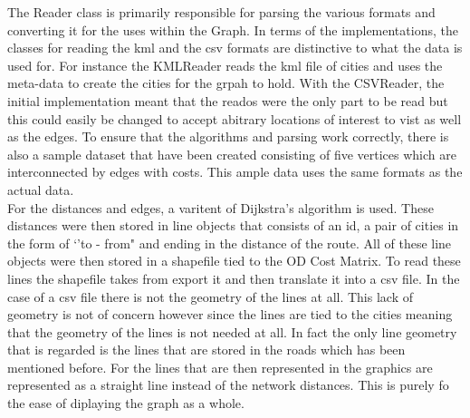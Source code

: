 \documentclass[midd]{thesis}
\newcommand{\tab}{\hspace*{2em}}
\begin{document}
\tab The Reader class is primarily responsible for parsing the various formats and converting it for the uses within the Graph. In terms of the implementations, the classes for reading the kml and the csv formats are distinctive to what the data is used for. For instance the KMLReader reads the kml file of cities and uses the meta-data to create the cities for the grpah to hold. With the CSVReader, the initial implementation meant that the reados were the only part to be read but this could easily be changed to accept abitrary locations of interest to vist as well as the edges. To ensure that the algorithms and parsing work correctly, there is also a sample dataset that have been created consisting of five vertices which are interconnected by edges with costs. This ample data uses the same formats as the actual data.\\
\tab For the distances and edges, a varitent of Dijkstra's algorithm is used\cite{gis}. These distances were then stored in line objects that consists of an id, a pair of cities in the form of `'to - from" and ending in the distance of the route. All of these line objects were then stored in a shapefile tied to the OD Cost Matrix. To read these lines the shapefile takes from export it and then translate it into a csv file. In the case of a csv file there is not the geometry of the lines at all. This lack of geometry is not of concern however since the lines are tied to the cities meaning that the geometry of the lines is not needed at all. In fact the only line geometry that is regarded is the lines that are stored in the roads which has been mentioned before. For the lines that are then represented in the graphics are represented as a straight line instead of the network distances. This is purely fo the ease of diplaying the graph as a whole.\\ 
\end{document}
